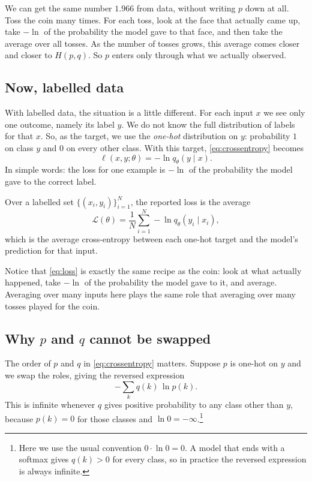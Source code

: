 \documentclass[12pt]{article}
\begin{document}
We can get the same number $1.966$ from data, without writing $p$ down
at all. Toss the coin many times. For each toss, look at the face that
actually came up, take $-\ln$ of the probability the model gave to that
face, and then take the average over all tosses. As the number of
tosses grows, this average comes closer and closer to $H(p, q)$. So
$p$ enters only through what we actually observed.

\subsection*{Now, labelled data}

With labelled data, the situation is a little different. For each input
$x$ we see only one outcome, namely its label $y$. We do not know the
full distribution of labels for that $x$. So, as the target, we use the
\emph{one-hot} distribution on $y$: probability $1$ on class $y$ and
$0$ on every other class. With this target, \eqref{eq:crossentropy}
becomes
\begin{equation}
  \ell(x, y; \theta) = -\ln q_\theta(y \mid x).
  \label{eq:perexample}
\end{equation}
In simple words: the loss for one example is $-\ln$ of the probability
the model gave to the correct label.

Over a labelled set $\{(x_i, y_i)\}_{i=1}^{N}$, the reported loss is
the average
\begin{equation}
  \mathcal{L}(\theta)
  = \frac{1}{N} \sum_{i=1}^{N} -\ln q_\theta(y_i \mid x_i),
  \label{eq:loss}
\end{equation}
which is the average cross-entropy between each one-hot target and the
model's prediction for that input.

Notice that \eqref{eq:loss} is exactly the same recipe as the coin:
look at what actually happened, take $-\ln$ of the probability the
model gave to it, and average. Averaging over many inputs here plays
the same role that averaging over many tosses played for the coin.

\subsection*{Why $p$ and $q$ cannot be swapped}

The order of $p$ and $q$ in \eqref{eq:crossentropy} matters. Suppose
$p$ is one-hot on $y$ and we swap the roles, giving the reversed
expression
\begin{equation}
  -\sum_{k} q(k)\,\ln p(k).
  \label{eq:reversed}
\end{equation}
This is infinite whenever $q$ gives positive probability to any class
other than $y$, because $p(k) = 0$ for those classes and
$\ln 0 = -\infty$.\footnote{Here we use the usual convention $0 \cdot \ln 0 = 0$.
A model that ends with a softmax gives $q(k) > 0$ for every class, so
in practice the reversed expression is always infinite.}
\end{document}
